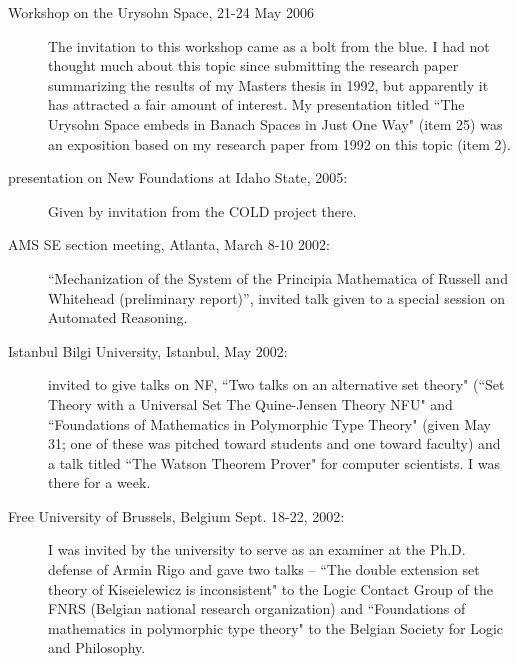 \begin{description}
\begin{description}
\item[Workshop on the Urysohn Space, 21-24 May 2006]   The invitation to this workshop came as a bolt from the blue.  I had not thought much about this topic since submitting the research paper summarizing the results of my Masters thesis in 1992, but apparently it has attracted a fair amount of interest.  My presentation titled ``The Urysohn Space embeds in Banach Spaces in Just One Way"
(item 25) was an exposition based on my research paper from 1992 on this topic (item 2).

\item[presentation on New Foundations at Idaho State, 2005:]  Given by invitation from the COLD project there.

\item[AMS SE section meeting, Atlanta, March 8-10 2002:]  ``Mechanization of the System of the Principia Mathematica of Russell and Whitehead (preliminary report)'', invited talk given to a special session on Automated Reasoning.

\item[Istanbul Bilgi University, Istanbul, May 2002:]  invited to give talks on NF, ``Two talks on an alternative set theory"
(``Set Theory with a Universal Set
The Quine-Jensen Theory NFU" and ``Foundations of Mathematics in Polymorphic Type Theory"  (given May 31; one of these was pitched toward students and one toward faculty) and a talk titled ``The Watson Theorem Prover" for computer scientists.  I was there for a week.

\item[Free University of Brussels, Belgium Sept. 18-22, 2002:]  I was invited by the university to serve as an examiner at the Ph.D. defense of Armin Rigo and gave two talks -- ``The double extension set theory of Kiseielewicz is inconsistent" to the Logic Contact Group of the FNRS (Belgian national research organization) and ``Foundations of mathematics in polymorphic type theory" to the Belgian Society for Logic and Philosophy.







\end{description}



\end{description}

